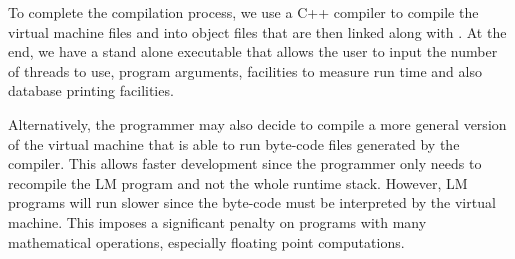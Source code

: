 To complete the compilation process, we use a C++ compiler to compile the
virtual machine files and  into object files that are then linked
along with . At the end, we have a stand alone executable that
allows the user to input the number of threads to use, program arguments,
facilities to measure run time and also database printing facilities.

Alternatively, the programmer may also decide to compile a more general version
of the virtual machine that is able to run byte-code files generated by the
compiler. This allows faster development since the programmer only needs to
recompile the LM program and not the whole runtime stack. However, LM programs
will run slower since the byte-code must be interpreted by the virtual machine.
This imposes a significant penalty on programs with many mathematical
operations, especially floating point computations.
